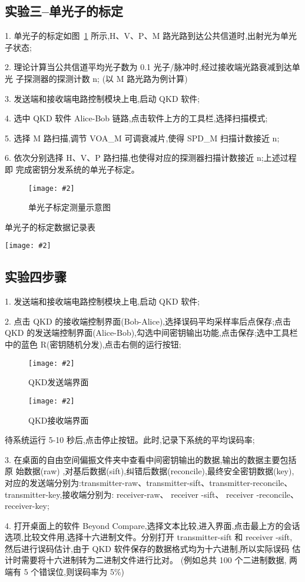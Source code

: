 \documentclass[11pt,a4paper]{ctexart}
\newcommand{\cpic}[2]{
\begin{center}
\texttt{[image: \#2]}
\end{center}
}
\newcommand{\cpicn}[3]
{
\begin{figure}[H]
\cpic{#1}{#2}
\caption{\color{red}#3\label{#2}}
\end{figure}
}
\begin{document}
\subsection{实验三--单光子的标定}
1. 单光子的标定如图~\ref{3-1} 所示,H、V、P、M 路光路到达公共信道时,出射光为单光
子状态;

2. 理论计算当公共信道平均光子数为 0.1 光子/脉冲时,经过接收端光路衰减到达单光
子探测器的探测计数 n;
(以 M 路光路为例计算)

3. 发送端和接收端电路控制模块上电,启动 QKD 软件;

4. 选中 QKD 软件 Alice-Bob 链路,点击软件上方的工具栏,选择扫描模式;

5. 选择 M 路扫描,调节 VOA\_M 可调衰减片,使得 SPD\_M 扫描计数接近 n;

6. 依次分别选择 H、V、P 路扫描,也使得对应的探测器扫描计数接近 n;上述过程即
完成密钥分发系统的单光子标定。
\cpicn{0.3}{3-1}{单光子标定测量示意图}

\begin{table}[H]
  \caption{单光子的标定数据记录表}
  \begin{center}
  \cpic{0.3}{exp3}
  \end{center}
\end{table}
\subsection{实验四步骤}
1. 发送端和接收端电路控制模块上电,启动 QKD 软件;

2. 点击 QKD 的接收端控制界面(Bob-Alice),选择误码平均采样率后点保存;点击
QKD 的发送端控制界面(Alice-Bob),勾选中间密钥输出功能,点击保存;选中工具栏中的蓝色 R(密钥随机分发),点击右侧的运行按钮;

\cpicn{0.3}{QKD_send}{QKD发送端界面}
\cpicn{0.3}{QKD_recieve}{QKD接收端界面}

待系统运行 5-10 秒后,点击停止按钮。此时,记录下系统的平均误码率;

3. 在桌面的自由空间偏振文件夹中查看中间密钥输出的数据,输出的数据主要包括原
始数据(raw)
,对基后数据(sift),纠错后数据(reconcile),最终安全密钥数据(key),
对应的发送端分别为:transmitter-raw、transmitter-sift、transmitter-reconcile、
transmitter-key,接收端分别为: receiver-raw、 receiver -sift、 receiver -reconcile、 receiver-key;

4. 打开桌面上的软件 Beyond Compare,选择文本比较,进入界面,点击最上方的会话
选项,比较文件用,选择十六进制文件。分别打开 transmitter-sift 和 receiver -sift,
然后进行误码估计,由于 QKD 软件保存的数据格式均为十六进制,所以实际误码
估计时需要将十六进制转为二进制文件进行比对。
(例如总共 100 个二进制数据,
两端有 5 个错误位,则误码率为 5\%)
\end{document}
